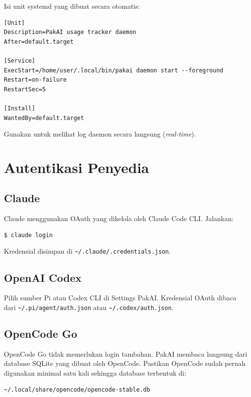 Isi unit systemd yang dibuat secara otomatis:

\begin{lstlisting}[style=toml]
[Unit]
Description=PakAI usage tracker daemon
After=default.target

[Service]
ExecStart=/home/user/.local/bin/pakai daemon start --foreground
Restart=on-failure
RestartSec=5

[Install]
WantedBy=default.target
\end{lstlisting}

\begin{tipbox}
  Gunakan  untuk melihat log daemon secara
  langsung (\textit{real-time}).
\end{tipbox}

\section{Autentikasi Penyedia}

\subsection{Claude}

Claude menggunakan OAuth yang dikelola oleh Claude Code CLI. Jalankan:

\begin{lstlisting}[style=terminal]
$ claude login
\end{lstlisting}

Kredensial disimpan di \texttt{\textasciitilde/.claude/.credentials.json}.

\subsection{OpenAI Codex}

Pilih sumber Pi atau Codex CLI di Settings PakAI. Kredensial OAuth dibaca dari
\texttt{\textasciitilde/.pi/agent/auth.json} atau \texttt{\textasciitilde/.codex/auth.json}.

\subsection{OpenCode Go}

OpenCode Go tidak memerlukan login tambahan. PakAI membaca langsung dari database
SQLite yang dibuat oleh OpenCode. Pastikan OpenCode sudah pernah digunakan minimal
satu kali sehingga database terbentuk di:

\begin{lstlisting}[style=terminal]
~/.local/share/opencode/opencode-stable.db
\end{lstlisting}

